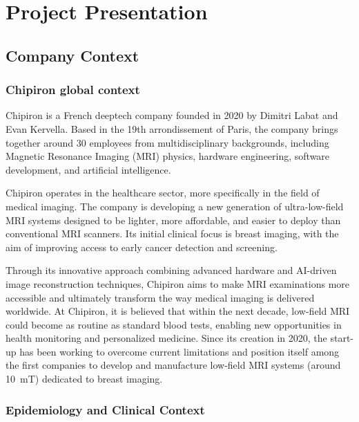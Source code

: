 \documentclass[12pt]{article}
\begin{document}


\tableofcontents
\newpage

\section{Project Presentation}
\subsection{Company Context}

\subsubsection{Chipiron global context}

Chipiron is a French deeptech company founded in 2020 by Dimitri Labat and Evan Kervella. 
Based in the 19th arrondissement of Paris, the company brings together around 30 employees from multidisciplinary backgrounds, including Magnetic Resonance Imaging (MRI) physics, hardware engineering, software development, and artificial intelligence.
\vspace{0.5cm}

Chipiron operates in the healthcare sector, more specifically in the field of medical imaging. 
The company is developing a new generation of ultra-low-field MRI systems designed to be lighter, more affordable, and easier to deploy than conventional MRI scanners.
Its initial clinical focus is breast imaging, with the aim of improving access to early cancer detection and screening.
\vspace{0.5cm}

Through its innovative approach combining advanced hardware and AI-driven image reconstruction techniques, Chipiron aims to make MRI examinations more accessible and ultimately transform the way medical imaging is delivered worldwide.
At Chipiron, it is believed that within the next decade, low-field MRI could become as routine as standard blood tests, enabling new opportunities in health monitoring and personalized medicine. 
Since its creation in 2020, the start-up has been working to overcome current limitations and position itself among the first companies to develop and manufacture low-field MRI systems (around 10~mT) dedicated to breast imaging.

\subsubsection{Epidemiology and Clinical Context}
\end{document}
